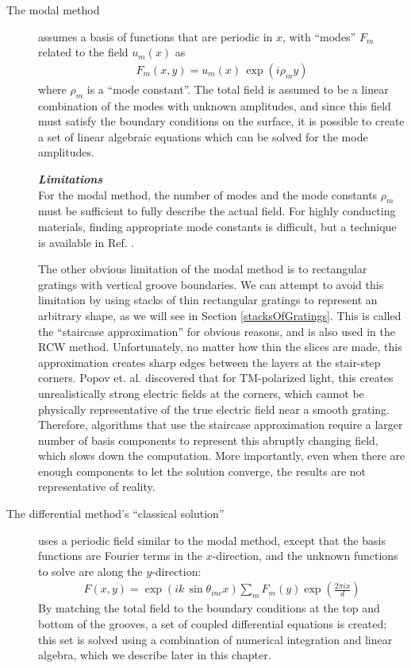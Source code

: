 \begin{description}
\item[The modal method] assumes a basis of functions that are periodic in $x$, with ``modes'' $F_m$ related to the field $u_m(x)$ as
\begin{eqnarray}
F_m(x,y)=u_m(x) \, \exp \left( i \rho_m y \right)
\end{eqnarray}
where $\rho_m$ is a ``mode constant''.  The total field is assumed to be a linear combination of the modes with unknown amplitudes, and since this field must satisfy the boundary conditions on the surface, it is possible to create a set of linear algebraic equations which can be solved for the mode amplitudes.

\noindent\textbf{\emph{Limitations}}\\
For the modal method, the number of modes and the mode constants $\rho_m$ must be sufficient to fully describe the actual field.  For highly conducting materials, finding appropriate mode constants is difficult, but a technique is available in Ref. \cite{And81}.  

The other obvious limitation of the modal method is to rectangular gratings with vertical groove boundaries.  We can attempt to avoid this limitation by using stacks of thin rectangular gratings to represent an arbitrary shape, as we will see in Section \ref{stacksOfGratings}.  This is called the ``staircase approximation'' for obvious reasons, and is also used in the RCW method.  Unfortunately, no matter how thin the slices are made, this approximation creates sharp edges between the layers at the stair-step corners.  Popov et. al. discovered that for TM-polarized light, this creates unrealistically strong electric fields at the corners, which cannot be physically representative of the true electric field near a smooth grating.  Therefore, algorithms that use the staircase approximation require a larger number of basis components to represent this abruptly changing field, which slows down the computation.  More importantly, even when there are enough components to let the solution converge, the results are not representative of reality. \cite{Pop02} 

\item[The differential method's ``classical solution''] uses a periodic field similar to the modal method, except that the basis functions are Fourier terms in the $x$-direction, and the unknown functions to solve are along the $y$-direction:
\begin{eqnarray}
F(x,y)=\exp\left( ik\, \sin \theta_{inc}x \right) \sum\limits_m F_m(y) \exp \left( \frac{2\pi i x}{d} \right)
\end{eqnarray}
By matching the total field to the boundary conditions at the top and bottom of the grooves, a set of coupled differential equations is created; this set is solved using a combination of numerical integration and linear algebra, which we describe later in this chapter.  


\end{description}
